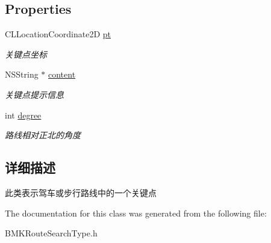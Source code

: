 \subsection*{Properties}
\begin{DoxyCompactItemize}
\item 
\hypertarget{interface_b_m_k_step_ad517bf5db8d177cb33cd94489dbaac51}{C\-L\-Location\-Coordinate2\-D \hyperlink{interface_b_m_k_step_ad517bf5db8d177cb33cd94489dbaac51}{pt}}\label{interface_b_m_k_step_ad517bf5db8d177cb33cd94489dbaac51}

\begin{DoxyCompactList}\small\item\em 关键点坐标 \end{DoxyCompactList}\item 
\hypertarget{interface_b_m_k_step_a647dc013ca983bb77a6d0f4407ee1d63}{N\-S\-String $\ast$ \hyperlink{interface_b_m_k_step_a647dc013ca983bb77a6d0f4407ee1d63}{content}}\label{interface_b_m_k_step_a647dc013ca983bb77a6d0f4407ee1d63}

\begin{DoxyCompactList}\small\item\em 关键点提示信息 \end{DoxyCompactList}\item 
\hypertarget{interface_b_m_k_step_a072bddb98bea4d5da2d6a5f54df46599}{int \hyperlink{interface_b_m_k_step_a072bddb98bea4d5da2d6a5f54df46599}{degree}}\label{interface_b_m_k_step_a072bddb98bea4d5da2d6a5f54df46599}

\begin{DoxyCompactList}\small\item\em 路线相对正北的角度 \end{DoxyCompactList}\end{DoxyCompactItemize}


\subsection{详细描述}
此类表示驾车或步行路线中的一个关键点 

The documentation for this class was generated from the following file\-:\begin{DoxyCompactItemize}
\item 
B\-M\-K\-Route\-Search\-Type.\-h\end{DoxyCompactItemize}
